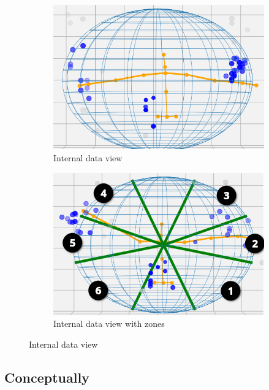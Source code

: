 \begin{figure}[h]
    \begin{subfigure}{0.5\textwidth}
        \includegraphics[width=0.9\linewidth]{figures/internal data/IAmMuse internal view.png}
        \caption{Internal data view}
        \label{figure: internal data view - a}
    \end{subfigure}
    \begin{subfigure}{0.5\textwidth}
        \includegraphics[width=0.9\linewidth]{figures/internal data/IAmMuse internal view with zones2.png}
        \caption{Internal data view with zones}
        \label{figure: internal data view - b}
    \end{subfigure}
    
    \caption{Internal data view}
    \label{figure: internal data view}
\end{figure}


\subsection{Conceptually}
\label{sub-section: tracking method - data interpretation - conceptually}

